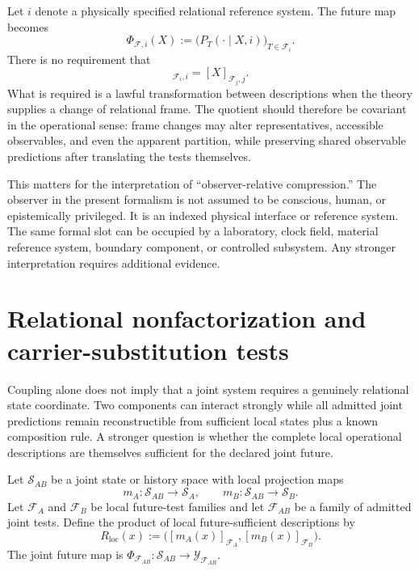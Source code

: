 \documentclass[11pt]{article}
\newcommand{\F}{\mathcal F}
\newcommand{\Sspace}{\mathcal S}
\newcommand{\Y}{\mathcal Y}
\begin{document}
Let $i$ denote a physically specified relational reference system. The future map becomes
\begin{equation}
  \Phi_{\F,i}(X)
  :=
  \bigl(P_T(\cdot\mid X,i)\bigr)_{T\in\F_i}.
  \label{eq:indexed-future}
\end{equation}
There is no requirement that
\begin{equation}
  [X]_{\F_i,i}=[X]_{\F_j,j}.
\end{equation}
What is required is a lawful transformation between descriptions when the theory supplies a change of relational frame. The quotient should therefore be covariant in the operational sense: frame changes may alter representatives, accessible observables, and even the apparent partition, while preserving shared observable predictions after translating the tests themselves.

This matters for the interpretation of ``observer-relative compression.'' The observer in the present formalism is not assumed to be conscious, human, or epistemically privileged. It is an indexed physical interface or reference system. The same formal slot can be occupied by a laboratory, clock field, material reference system, boundary component, or controlled subsystem. Any stronger interpretation requires additional evidence.

\section{Relational nonfactorization and carrier-substitution tests}
\label{sec:nonfactor}

Coupling alone does not imply that a joint system requires a genuinely relational state coordinate. Two components can interact strongly while all admitted joint predictions remain reconstructible from sufficient local states plus a known composition rule. A stronger question is whether the complete local operational descriptions are themselves sufficient for the declared joint future.

Let $\Sspace_{AB}$ be a joint state or history space with local projection maps
\begin{equation}
  m_A:\Sspace_{AB}\to\Sspace_A,
  \qquad
  m_B:\Sspace_{AB}\to\Sspace_B.
  \label{eq:local-projections}
\end{equation}
Let $\F_A$ and $\F_B$ be local future-test families and let $\F_{AB}$ be a family of admitted joint tests. Define the product of local future-sufficient descriptions by
\begin{equation}
  R_{\mathrm{loc}}(x)
  :=
  \bigl(
    [m_A(x)]_{\F_A},
    [m_B(x)]_{\F_B}
  \bigr).
  \label{eq:local-quotient-pair}
\end{equation}
The joint future map is $\Phi_{\F_{AB}}: \Sspace_{AB}\to\Y_{\F_{AB}}$.
\end{document}
